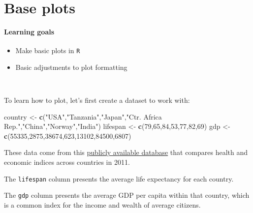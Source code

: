 \documentclass[
]{book}
\newenvironment{Shaded}{\begin{snugshade}}{\end{snugshade}}
\newcommand{\DecValTok}[1]{\textcolor[rgb]{0.00,0.00,0.81}{#1}}
\newcommand{\FunctionTok}[1]{\textcolor[rgb]{0.13,0.29,0.53}{\textbf{#1}}}
\newcommand{\NormalTok}[1]{#1}
\newcommand{\OtherTok}[1]{\textcolor[rgb]{0.56,0.35,0.01}{#1}}
\newcommand{\StringTok}[1]{\textcolor[rgb]{0.31,0.60,0.02}{#1}}
\providecommand{\tightlist}{%
  \setlength{\itemsep}{0pt}\setlength{\parskip}{0pt}}
\begin{document}
\chapter{Base plots}\label{base-plots}

\subsubsection*{Learning goals}\label{learning-goals-9}

\begin{itemize}
\tightlist
\item
  Make basic plots in \texttt{R}
\item
  Basic adjustments to plot formatting
\end{itemize}

~

To learn how to plot, let's first create a dataset to work with:

\begin{Shaded}
\begin{Highlighting}[]
\NormalTok{country }\OtherTok{\textless{}{-}} \FunctionTok{c}\NormalTok{(}\StringTok{"USA"}\NormalTok{,}\StringTok{"Tanzania"}\NormalTok{,}\StringTok{"Japan"}\NormalTok{,}\StringTok{"Ctr. Africa Rep."}\NormalTok{,}\StringTok{"China"}\NormalTok{,}\StringTok{"Norway"}\NormalTok{,}\StringTok{"India"}\NormalTok{)}
\NormalTok{lifespan }\OtherTok{\textless{}{-}} \FunctionTok{c}\NormalTok{(}\DecValTok{79}\NormalTok{,}\DecValTok{65}\NormalTok{,}\DecValTok{84}\NormalTok{,}\DecValTok{53}\NormalTok{,}\DecValTok{77}\NormalTok{,}\DecValTok{82}\NormalTok{,}\DecValTok{69}\NormalTok{)}
\NormalTok{gdp }\OtherTok{\textless{}{-}} \FunctionTok{c}\NormalTok{(}\DecValTok{55335}\NormalTok{,}\DecValTok{2875}\NormalTok{,}\DecValTok{38674}\NormalTok{,}\DecValTok{623}\NormalTok{,}\DecValTok{13102}\NormalTok{,}\DecValTok{84500}\NormalTok{,}\DecValTok{6807}\NormalTok{)}
\end{Highlighting}
\end{Shaded}

These data come from this \href{https://datasets.iisg.amsterdam/dataset.xhtml?persistentId=hdl:10622/LKYT53}{publicly available database} that compares health and economic indices across countries in 2011.

The \texttt{lifespan} column presents the average life expectancy for each country.

The \texttt{gdp} column presents the average GDP per capita within that country, which is a common index for the income and wealth of average citizens.
\end{document}
